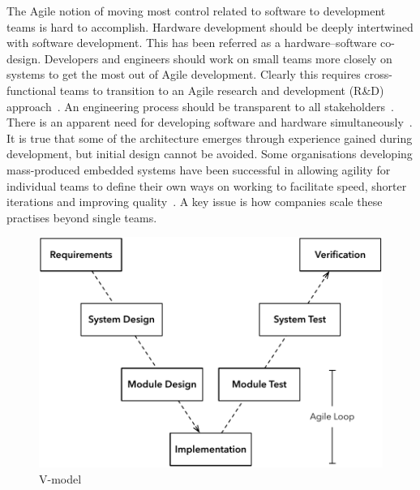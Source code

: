 \documentclass[english]{tktltiki2}
\begin{document}
The Agile notion of moving most control related to software to development teams is hard to accomplish. Hardware development should be deeply intertwined with software development. This has been referred as a hardware–software co-design. Developers and engineers should work on small teams more closely on systems to get the most out of Agile development. Clearly this requires cross-functional teams to transition to an Agile research and development (R\&D) approach~\cite{HAB12, EHS14}. An engineering process should be transparent to all stakeholders~\cite{KRM13}. There is an apparent need for developing software and hardware simultaneously~\cite{RA03}. It is true that some of the architecture emerges through experience gained during development, but initial design cannot be avoided. Some organisations developing mass-produced embedded systems have been successful in allowing agility for individual teams to define their own ways on working to facilitate speed, shorter iterations and improving quality~\cite{EHS14}. A key issue is how companies scale these practises beyond single teams.

\begin{figure}[h!]

    \centering

    \includegraphics[scale = 0.6]{figures/v-model}

    \caption{V-model~\cite{EHS14}}
    \label{figure:v-model}

    \vspace{1cm}

\end{figure}
\end{document}
